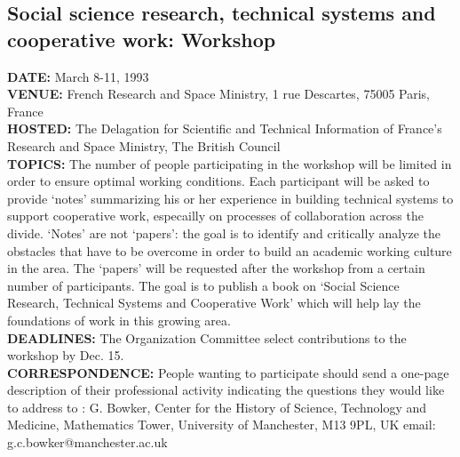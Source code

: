 \subsection{Social science research, technical systems and cooperative
work: Workshop}
{\bf DATE:} March 8-11, 1993\\
{\bf VENUE:} French Research and Space Ministry, 1 rue Descartes,
75005 Paris, France \\
{\bf HOSTED:} The Delagation for Scientific and Technical Information
of France's Research and Space Ministry, The British Council\\
{\bf TOPICS:}     The number of people participating in the workshop will be
limited in order to ensure optimal working conditions.  Each
participant will be asked to provide `notes' summarizing his or her
experience in building technical systems to support cooperative work,
especailly on processes of collaboration across the divide.  `Notes'
are not `papers': the goal is to identify and critically analyze the
obstacles that have to be overcome in order to build an academic
working culture in the area.  The `papers' will be requested after the
workshop from a certain number of participants.  The goal is to
publish a book on `Social Science Research, Technical Systems and
Cooperative Work' which will help lay the foundations of work in this
growing area.\\
{\bf DEADLINES:} The Organization Committee select contributions to
the workshop by Dec. 15.\\
{\bf CORRESPONDENCE:}  People wanting to participate should send a
one-page description of their professional activity indicating the
questions they would like to address to :
        G. Bowker, Center for the History of Science,
        Technology and Medicine, Mathematics Tower, University
        of Manchester, M13 9PL, UK
            email:  g.c.bowker@manchester.ac.uk

